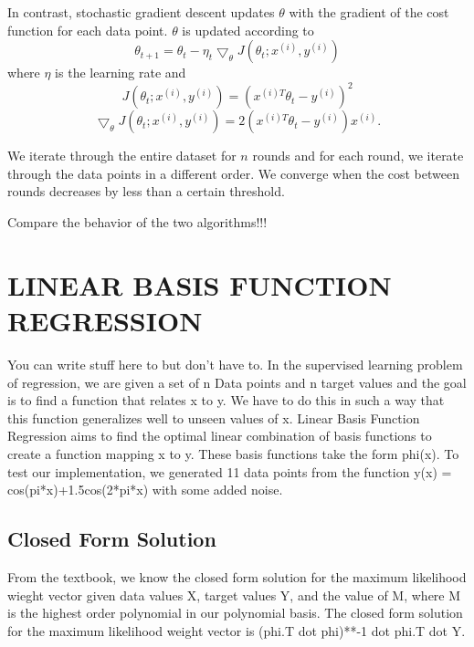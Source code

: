\documentclass[a4paper,twoside]{article}
\begin{document}
In contrast, stochastic gradient descent updates $\theta$ with the gradient of the cost function for each data point. $\theta$ is updated according to 
\begin{equation}
\theta_{t+1} = \theta_t - \eta_t \bigtriangledown_\theta J(\theta_t; x^{(i)}, y^{(i)})
\end{equation}
where $\eta$ is the learning rate and
\begin{equation}
J(\theta_t; x^{(i)}, y^{(i)}) = (x^{(i)T} \theta_t - y^{(i)})^2
\end{equation}
\begin{equation}
\bigtriangledown_\theta J(\theta_t; x^{(i)}, y^{(i)}) = 2(x^{(i)T} \theta_t - y^{(i)}) x^{(i)}.
\end{equation}

 We iterate through the entire dataset for $n$ rounds and for each round, we iterate through the data points in a different order. We converge when the cost between rounds decreases by less than a certain threshold. 


 Compare the behavior of the two algorithms!!!



\section{\uppercase{Linear Basis Function Regression}}

You can write stuff here to but don't have to. In the supervised learning problem of regression, we are given a set of n Data points and n target values and the goal is to find a function that relates x to y. We have to do this in such a way that this function generalizes well to unseen values of x. Linear Basis Function Regression aims to find the optimal linear combination of basis functions to create a function mapping x to y. These basis functions take the form phi(x). To test our implementation, we generated 11 data points from the function y(x) = cos(pi*x)+1.5cos(2*pi*x) with some added noise. 

\subsection{Closed Form Solution}

From the textbook, we know the closed form solution for the maximum likelihood wieght vector given data values X, target values Y, and the value of M, where M is the highest order polynomial in our polynomial basis. The closed form solution for the maximum likelihood weight vector is (phi.T dot phi)**-1 dot phi.T dot Y. 
\end{document}
